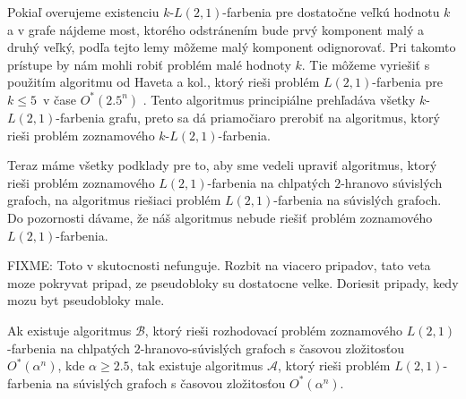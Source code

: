 Pokiaľ overujeme existenciu $k$-$L(2,1)$-farbenia pre dostatočne veľkú hodnotu $k$ a v grafe
nájdeme most, ktorého odstránením bude prvý komponent malý a druhý veľký, podľa tejto lemy
môžeme malý komponent odignorovať. Pri takomto prístupe by nám mohli robiť problém malé
hodnoty $k$. Tie môžeme vyriešiť s použitím algoritmu od Haveta a kol., ktorý rieši
problém $L(2,1)$-farbenia pre $k \leq 5$ v čase $O^*(2.5^n)$ \cite{havet}. Tento
algoritmus principiálne prehľadáva všetky $k$-$L(2,1)$-farbenia grafu, preto sa dá
priamočiaro prerobiť na algoritmus, ktorý rieši problém zoznamového $k$-$L(2,1)$-farbenia.

Teraz máme všetky podklady pre to, aby sme vedeli upraviť algoritmus,
ktorý rieši problém zoznamového $L(2,1)$-farbenia na chlpatých
$2$-hranovo súvislých grafoch, na algoritmus riešiaci problém $L(2,1)$-farbenia
na súvislých grafoch. Do pozornosti dávame, že náš algoritmus nebude riešiť
problém zoznamového $L(2,1)$-farbenia.

\begin{veta}
    FIXME: Toto v skutocnosti nefunguje. Rozbit na viacero pripadov, tato veta moze pokryvat pripad, ze
    pseudobloky su dostatocne velke. Doriesit pripady, kedy mozu byt pseudobloky male.

    Ak existuje algoritmus $\mathcal{B}$, ktorý rieši rozhodovací problém zoznamového $L(2,1)$-farbenia
    na chlpatých $2$-hranovo-súvislých grafoch s časovou zložitosťou $O^*(\alpha^n)$, kde
    $\alpha \ge 2.5$, tak existuje algoritmus $\mathcal{A}$, ktorý rieši problém $L(2,1)$-farbenia
    na súvislých grafoch s časovou zložitosťou $O^*(\alpha^n)$.
\end{veta}

